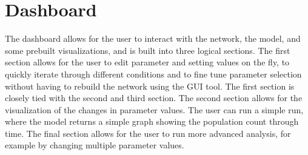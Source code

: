 \section{Dashboard}
The dashboard allows for the user to interact with the network, the model, and some prebuilt visualizations, and is built into three logical sections. 
The first section allows for the user to edit parameter and setting values on the fly, to quickly iterate through different conditions and to fine tune parameter selection without having to rebuild the network using the GUI tool. 
The first section is closely tied with the second and third section. 
The second section allows for the visualization of the changes in parameter values. 
The user can run a simple run, where the model returns a simple graph showing the population count through time. 
The final section allows for the user to run more advanced analysis, for example by changing multiple parameter values. 
